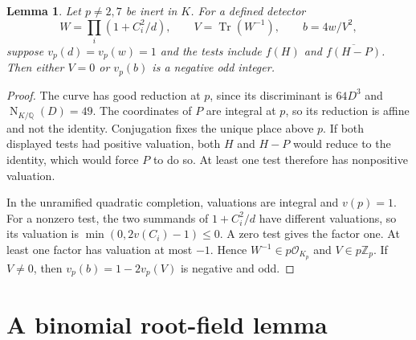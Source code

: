 \documentclass[11pt,a4paper]{article}
\newtheorem{lemma}[theorem]{Lemma}
\newcommand{\Q}{\mathbb Q}\newcommand{\Z}{\mathbb Z}
\DeclareMathOperator{\Tr}{Tr}\DeclareMathOperator{\Gal}{Gal}
\begin{document}
\begin{lemma}\label{lem:inert}
Let $p\ne2,7$ be inert in $K$. For a defined detector
\[
 W=\prod_i(1+C_i^2/d),\qquad V=\Tr(W^{-1}),\qquad b=4w/V^2,
\]
suppose $v_p(d)=v_p(w)=1$ and the tests include
$f(H)$ and $\overline{f(H-P)}$. Then either $V=0$ or $v_p(b)$
is a negative odd integer.
\end{lemma}
\begin{proof}
The curve has good reduction at $p$, since its discriminant is
$64D^3$ and $\operatorname{N}_{K/\Q}(D)=49$. The coordinates of $P$
are integral at $p$, so its reduction is affine and not the identity.
Conjugation fixes the unique place above $p$. If both displayed tests
had positive valuation, both $H$ and $H-P$ would reduce to the identity,
which would force $P$ to do so. At least one test therefore has
nonpositive valuation.

In the unramified quadratic completion, valuations are integral and
$v(p)=1$. For a nonzero test, the two summands of $1+C_i^2/d$ have
different valuations, so its valuation is $\min(0,2v(C_i)-1)\le0$.
A zero test gives the factor one. At least one factor has valuation
at most $-1$. Hence $W^{-1}\in p\mathcal O_{K_p}$ and
$V\in p\Z_p$. If $V\ne0$, then $v_p(b)=1-2v_p(V)$ is negative
and odd.
\end{proof}

\section{A binomial root-field lemma}
\end{document}
